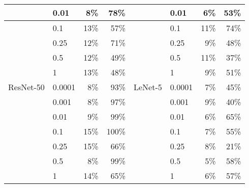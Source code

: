 \begin{table}
\begin{tabular}{|l|l|r|r|l|l|r|r|}
          & 0.01   & 8\%     & 78\%     &           & 0.01   & 6\%     & 53\%     \\ \hline
          & 0.1    & 13\%    & 57\%     &           & 0.1    & 11\%    & 74\%     \\ \hline
          & 0.25   & 12\%    & 71\%     &           & 0.25   & 9\%     & 48\%     \\ \hline
          & 0.5    & 12\%    & 49\%     &           & 0.5    & 11\%    & 37\%     \\ \hline
          & 1      & 13\%    & 48\%     &           & 1      & 9\%     & 51\%     \\ \hline
ResNet-50 & 0.0001 & 8\%     & 93\%     & LeNet-5   & 0.0001 & 7\%     & 45\%     \\ \hline
          & 0.001  & 8\%     & 97\%     &           & 0.001  & 9\%     & 40\%     \\ \hline
          & 0.01   & 9\%     & 99\%     &           & 0.01   & 6\%     & 65\%     \\ \hline
          & 0.1    & 15\%    & 100\%    &           & 0.1    & 7\%     & 55\%     \\ \hline
          & 0.25   & 15\%    & 66\%     &           & 0.25   & 8\%     & 21\%     \\ \hline
          & 0.5    & 8\%     & 99\%     &           & 0.5    & 5\%     & 58\%     \\ \hline
          & 1      & 14\%    & 65\%     &           & 1      & 6\%     & 57\%     \\ \hline
\end{tabular}

\label{tab:frontier-finetuning}
\end{table}

